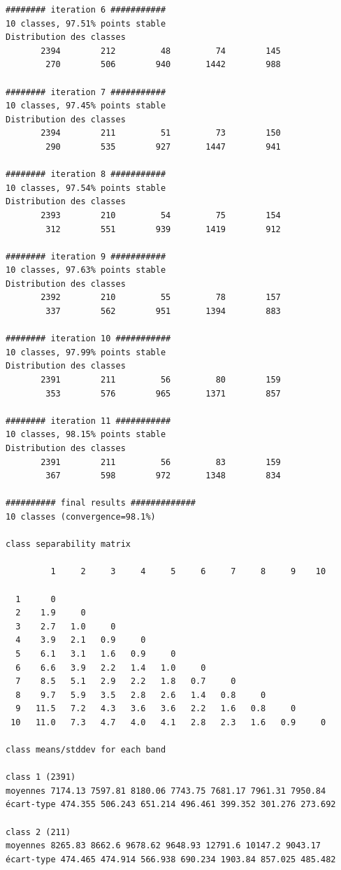 \documentclass[earth,article,accept,pdftex,moreauthors]{Definitions/mdpi}
\begin{document}
{\begin{scriptsize}
\begin{verbatim}
######## iteration 6 ###########
10 classes, 97.51% points stable
Distribution des classes
       2394        212         48         74        145
        270        506        940       1442        988

######## iteration 7 ###########
10 classes, 97.45% points stable
Distribution des classes
       2394        211         51         73        150
        290        535        927       1447        941

######## iteration 8 ###########
10 classes, 97.54% points stable
Distribution des classes
       2393        210         54         75        154
        312        551        939       1419        912

######## iteration 9 ###########
10 classes, 97.63% points stable
Distribution des classes
       2392        210         55         78        157
        337        562        951       1394        883

######## iteration 10 ###########
10 classes, 97.99% points stable
Distribution des classes
       2391        211         56         80        159
        353        576        965       1371        857

######## iteration 11 ###########
10 classes, 98.15% points stable
Distribution des classes
       2391        211         56         83        159
        367        598        972       1348        834

########## final results #############
10 classes (convergence=98.1%)

class separability matrix

         1     2     3     4     5     6     7     8     9    10

  1      0
  2    1.9     0
  3    2.7   1.0     0
  4    3.9   2.1   0.9     0
  5    6.1   3.1   1.6   0.9     0
  6    6.6   3.9   2.2   1.4   1.0     0
  7    8.5   5.1   2.9   2.2   1.8   0.7     0
  8    9.7   5.9   3.5   2.8   2.6   1.4   0.8     0
  9   11.5   7.2   4.3   3.6   3.6   2.2   1.6   0.8     0
 10   11.0   7.3   4.7   4.0   4.1   2.8   2.3   1.6   0.9     0

class means/stddev for each band

class 1 (2391)
moyennes 7174.13 7597.81 8180.06 7743.75 7681.17 7961.31 7950.84
écart-type 474.355 506.243 651.214 496.461 399.352 301.276 273.692

class 2 (211)
moyennes 8265.83 8662.6 9678.62 9648.93 12791.6 10147.2 9043.17
écart-type 474.465 474.914 566.938 690.234 1903.84 857.025 485.482


\end{verbatim}
\end{scriptsize}}
\end{document}
